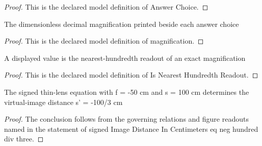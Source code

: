 \begin{proof}
  This is the declared model definition of Answer Choice.
\end{proof}
\begin{definition}[magnification]
  \label{def:physics:phyx-mini-0053:phyxminiproblems-problemphyxmini0053-answerchoice-magnification}
  The dimensionless decimal magnification printed beside each answer choice
\end{definition}
\begin{proof}
  This is the declared model definition of magnification.
\end{proof}
\begin{definition}
  \label{def:physics:phyx-mini-0053:phyxminiproblems-problemphyxmini0053-isnearesthundredthreadout}
  A displayed value is the nearest-hundredth readout of an exact magnification
\end{definition}
\begin{proof}
  This is the declared model definition of Is Nearest Hundredth Readout.
\end{proof}
\begin{lemma}
  \label{lem:physics:phyx-mini-0053:phyxminiproblems-problemphyxmini0053-signedimagedistanceincentimeters-eq-neg-hundred-div-three}
  The signed thin-lens equation with f = -50 cm and s = 100 cm determines the virtual-image distance s' = -100/3 cm
\end{lemma}
\begin{proof}
  The conclusion follows from the governing relations and figure readouts named in the statement of signed Image Distance In Centimeters eq neg hundred div three.
\end{proof}

